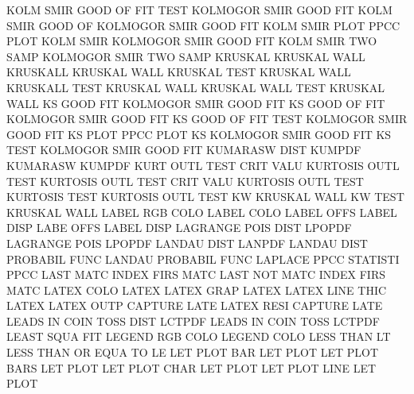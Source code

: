 KOLM     SMIR GOOD OF   FIT  TEST       KOLMOGOR SMIR GOOD FIT
KOLM     SMIR GOOD OF                   KOLMOGOR SMIR GOOD FIT
KOLM     SMIR PLOT                      PPCC     PLOT
KOLM     SMIR                           KOLMOGOR SMIR GOOD FIT
KOLM     SMIR TWO  SAMP                 KOLMOGOR SMIR TWO  SAMP
KRUSKAL                                 KRUSKAL  WALL
KRUSKALL                                KRUSKAL  WALL
KRUSKAL  TEST                           KRUSKAL  WALL
KRUSKALL TEST                           KRUSKAL  WALL
KRUSKAL  WALL TEST                      KRUSKAL  WALL
KS       GOOD FIT                       KOLMOGOR SMIR GOOD FIT
KS       GOOD OF   FIT                  KOLMOGOR SMIR GOOD FIT
KS       GOOD OF   FIT  TEST            KOLMOGOR SMIR GOOD FIT
KS       PLOT                           PPCC     PLOT
KS                                      KOLMOGOR SMIR GOOD FIT
KS       TEST                           KOLMOGOR SMIR GOOD FIT
KUMARASW DIST                           KUMPDF
KUMARASW                                KUMPDF
KURT     OUTL TEST CRIT VALU            KURTOSIS OUTL TEST
KURTOSIS OUTL TEST CRIT VALU            KURTOSIS OUTL TEST
KURTOSIS TEST                           KURTOSIS OUTL TEST
KW                                      KRUSKAL  WALL
KW       TEST                           KRUSKAL  WALL
LABEL    RGB  COLO                      LABEL    COLO
LABEL    OFFS                           LABEL    DISP
LABE     OFFS                           LABEL    DISP
LAGRANGE POIS DIST                      LPOPDF
LAGRANGE POIS                           LPOPDF
LANDAU   DIST                           LANPDF
LANDAU   DIST                           PROBABIL FUNC
LANDAU                                  PROBABIL FUNC
LAPLACE  PPCC                           STATISTI PPCC
LAST     MATC                           INDEX    FIRS MATC
LAST     NOT  MATC                      INDEX    FIRS MATC
LATEX    COLO                           LATEX
LATEX    GRAP                           LATEX
LATEX    LINE THIC                      LATEX
LATEX    OUTP                           CAPTURE  LATE
LATEX    RESI                           CAPTURE  LATE
LEADS    IN   COIN TOSS DIST            LCTPDF
LEADS    IN   COIN TOSS                 LCTPDF
LEAST    SQUA                           FIT
LEGEND   RGB  COLO                      LEGEND   COLO
LESS     THAN                           LT
LESS     THAN OR   EQUA TO              LE
LET      PLOT BAR                       LET      PLOT
LET      PLOT BARS                      LET      PLOT
LET      PLOT CHAR                      LET      PLOT
LET      PLOT LINE                      LET      PLOT
